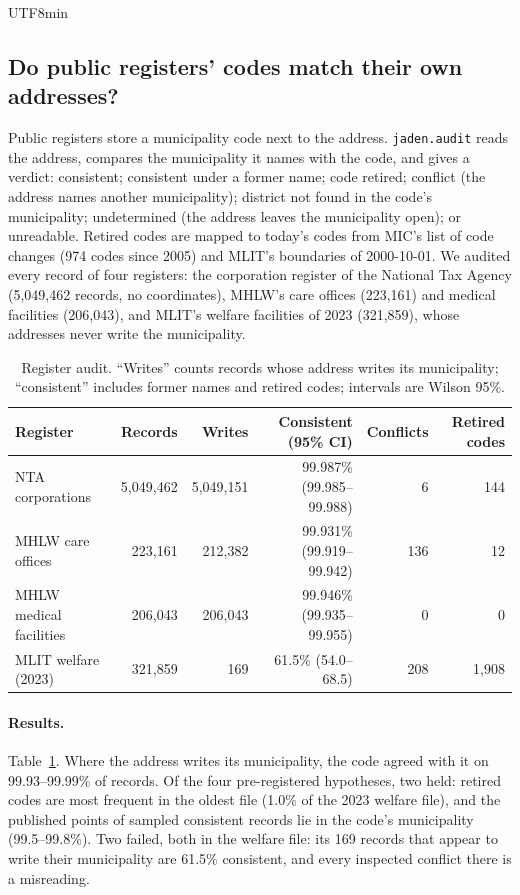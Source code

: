 \documentclass[10pt]{article}
\begin{document}
\begin{CJK}{UTF8}{min}
\subsection{Do public registers' codes match their own addresses?}\label{sec:registers}
Public registers store a municipality code next to the address. \texttt{jaden.audit} reads the address,
compares the municipality it names with the code, and gives a verdict: consistent; consistent under a
former name; code retired; conflict (the address names another municipality); district not found in the
code's municipality; undetermined (the address leaves the municipality open); or unreadable. Retired codes
are mapped to today's codes from MIC's list of code changes (974 codes since 2005) and MLIT's boundaries
of 2000-10-01. We audited every record of four registers: the corporation register of the National Tax
Agency (5,049,462 records, no coordinates), MHLW's care offices (223,161) and medical facilities (206,043),
and MLIT's welfare facilities of 2023 (321,859), whose addresses never write the municipality.

\begin{table}[t]\centering\small
\caption{Register audit. ``Writes'' counts records whose address writes its municipality; ``consistent''
includes former names and retired codes; intervals are Wilson 95\%.}\label{tab:registers}
\begin{tabular}{lrrrrr}\toprule
Register & Records & Writes & Consistent (95\% CI) & Conflicts & Retired codes \\ \midrule
NTA corporations & 5,049,462 & 5,049,151 & 99.987\% (99.985--99.988) & 6 & 144 \\
MHLW care offices & 223,161 & 212,382 & 99.931\% (99.919--99.942) & 136 & 12 \\
MHLW medical facilities & 206,043 & 206,043 & 99.946\% (99.935--99.955) & 0 & 0 \\
MLIT welfare (2023) & 321,859 & 169 & 61.5\% (54.0--68.5) & 208 & 1,908 \\ \bottomrule
\end{tabular}
\end{table}

\paragraph{Results.} Table~\ref{tab:registers}. Where the address writes its municipality, the code agreed
with it on 99.93--99.99\% of records. Of the four pre-registered hypotheses, two held: retired codes are
most frequent in the oldest file (1.0\% of the 2023 welfare file), and the published points of sampled
consistent records lie in the code's municipality (99.5--99.8\%). Two failed, both in the welfare file:
its 169 records that appear to write their municipality are 61.5\% consistent, and every inspected
conflict there is a misreading.


\end{CJK}
\end{document}
